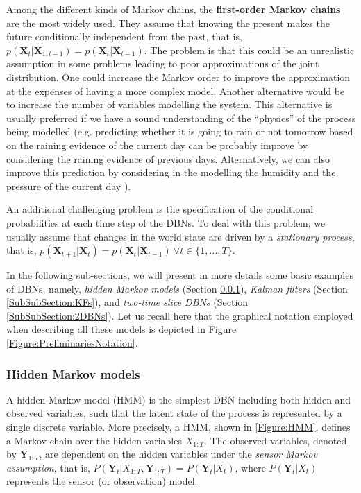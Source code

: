 Among the different kinds of Markov chains, the \textbf{first-order Markov chains} are the most widely used. They assume that knowing the present makes the future conditionally independent from the past, that is, $p(\bm X_t| \bm X_{1:t-1})  = p(\bm X_t|\bm X_{t-1})$. The problem is that this could be an unrealistic assumption in some problems leading to poor approximations of the joint distribution. One could increase the Markov order to improve the approximation at the expenses of having a more complex model. Another  alternative \cite{russelNorvig2009} would be to increase the number of variables modelling the system. This alternative is usually preferred if we have a sound understanding of the ``physics''  of the process being modelled (e.g. predicting whether it is going to rain or not tomorrow based on the raining evidence of the current day can be probably improve by considering the raining evidence of previous days. Alternatively, we can also improve this prediction by considering in the modelling the humidity and the pressure of the current day \cite{russelNorvig2009}). 

An additional challenging problem is the specification of the conditional probabilities at each time step of the DBNs. To deal with this problem, we usually assume that changes in the world state are driven by a \textit{stationary process}, that is, $p(\bm X_{t+1}|\bm X_{t}) = p(\bm X_t|\bm X_{t-1})\ \forall t \in\{1,\ldots,T\}$. 

In the following sub-sections, we will present in more details some basic examples of DBNs, namely, \textit{hidden Markov models} (Section \ref{SubSubSection:HMMs}), \textit{Kalman filters} (Section \ref{SubSubSection:KFs}), and \textit{two-time slice DBNs} (Section \ref{SubSubSection:2DBNs}). Let us recall here that the graphical notation employed when describing all these models is depicted in Figure \ref{Figure:PreliminariesNotation}.

\subsubsection{Hidden Markov models}\label{SubSubSection:HMMs}

A hidden Markov model (HMM) is the simplest DBN including both hidden and observed variables, such that the latent state of the process is represented by a single discrete variable. More precisely, a HMM, shown in \ref{Figure:HMM}, defines a Markov chain over the hidden variables $X_{1:T}$. The observed variables, denoted by $\bm Y_{1:T}$, are dependent on the hidden variables under the \textit{sensor Markov assumption}, that is, $P(\bm Y_t| X_{1:T}, \bm Y_{1:T}) = P(\bm Y_t| X_t)$, where $P(\bm Y_t| X_t)$ represents the sensor (or observation) model.  

